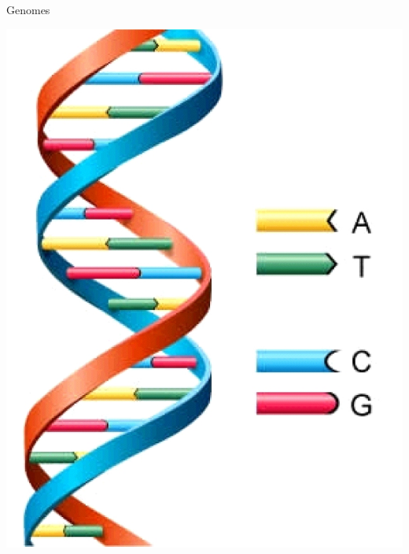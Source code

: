 \documentclass[xcolor=dvipsnames]{beamer}
\begin{document}
\begin{frame}{Genomes}
\begin{minipage}{0.23\textwidth}
        \vspace{0.05cm}
        \includegraphics[width=1.0\textwidth]{DNA.jpg}
    \end{minipage}
\end{frame}
\end{document}

